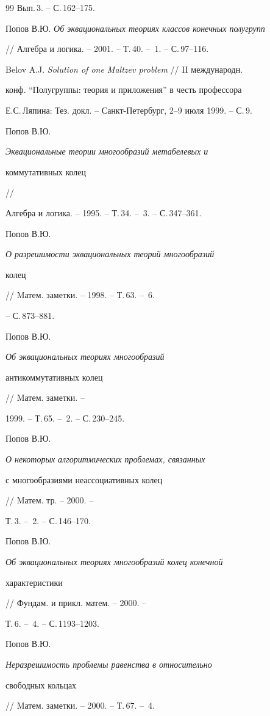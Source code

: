 \begin{thebibliography}{99}
Вып.\,3. -- С.\,162--175. 




Попов В.Ю. {\em Об эквациональных теориях классов конечных полугрупп} 


// Алгебра и логика. -- 2001. -- Т.\,40. -- \No\,1. -- С.\,97--116. 




Belov A.J. {\em Solution of one Maltzev problem} // II международн. 


конф. ``Полугруппы: теория и приложения'' в честь профессора 


Е.С.\,Ляпина: Тез. докл. -- Санкт-Петербург, 2--9 июля 1999. -- С.\,9. 




Попов В.Ю. {\em Эквациональные теории многообразий метабелевых и 


коммутативных колец} // 


Алгебра и логика. -- 1995. -- Т.\,34. -- \No\,3. -- С.\,347--361. 




Попов В.Ю. {\em О разрешимости эквациональных теорий многообразий 


колец} // Mатем. заметки. -- 1998. -- Т.\,63. -- \No\,6. 


-- С.\,873--881. 




Попов В.Ю. {\em Об эквациональных теориях многообразий 


антикоммутативных колец} // Mатем. заметки. -- 


1999. -- Т.\,65. -- \No\,2. -- С.\,230--245. 




Попов В.Ю. {\em О некоторых алгоритмических проблемах, связанных 


с многообразиями неассоциативных колец} // Mатем. тр. -- 2000. -- 


Т.\,3. -- \No\,2. -- С.\,146--170. 




Попов В.Ю. {\em Об эквациональных теориях многообразий колец конечной 


характеристики} // Фундам. и прикл. матем. -- 2000. -- 


Т.\,6. -- \No\,4. -- С.\,1193--1203. 




Попов В.Ю. {\em Неразрешимость проблемы равенства в относительно 


свободных кольцах} // Mатем. заметки. -- 2000. -- Т.\,67. -- \No\,4. 



\end{thebibliography}
